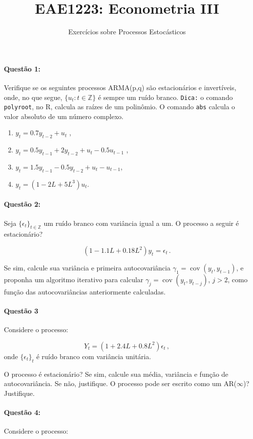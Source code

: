 \documentclass[10pt,a4paper]{article}
\title{\large EAE1223: Econometria III}
\author{\normalsize Exercícios sobre Processos Estocásticos}
\date{}
\begin{document}
	\maketitle
	\paragraph{Questão 1:}  Verifique se os seguintes processos ARMA(p,q) são estacionários e invertíveis, onde, no que segue, $\{u_t:t\in \mathbb{Z}\}$ é sempre um ruído branco. \texttt{Dica:} o comando \texttt{polyroot}, no R, calcula as raízes de um polinômio. O comando \texttt{abs} calcula o valor absoluto de um número complexo.
	
	\begin{enumerate}
		\item $y_t = 0.7 y_{t-2} + u_t$  ,
		\item $y_t = 0.5 y_{t-1} + 2y_{t-2} + u_t - 0.5 u_{t-1}$  ,
		\item $y_t = 1.5 y_{t-1}  - 0.5 y_{t-2} + u_t  - u_{t-1}$,
		\item $y_t = (1 - 2 L + 5 L^3)u_t$.
	\end{enumerate}
	
	\paragraph{Questão 2:} Seja $\{\epsilon_t\}_{t\in \mathbb{Z}}$ um ruído branco com variância igual a um. O processo a seguir é estacionário?
	
	$$(1-1.1L + 0.18L^2)y_t = \epsilon_t \, .$$
	
	Se sim, calcule sua variância e primeira autocovariância $\gamma_1 = \operatorname{cov}(y_t, y_{t-1})$, e proponha um algoritmo iterativo para calcular $\gamma_j = \operatorname{cov}(y_t, y_{t-j})$, $j>2$, como função das autocovariâncias anteriormente calculadas.
	
	
		\paragraph{Questão 3} Considere o processo:
	
	$$Y_t = (1+2.4L+0.8L^2)\epsilon_t\,,$$
	onde $\{\epsilon_t\}_t$ é ruído branco com variância unitária.
	
	O processo é estacionário? Se sim, calcule sua média, variância e função de autocovariância. Se não, justifique. O processo pode ser escrito como um AR($\infty$)? Justifique.

		\paragraph{Questão 4:} Considere o processo:
		
\end{document}
